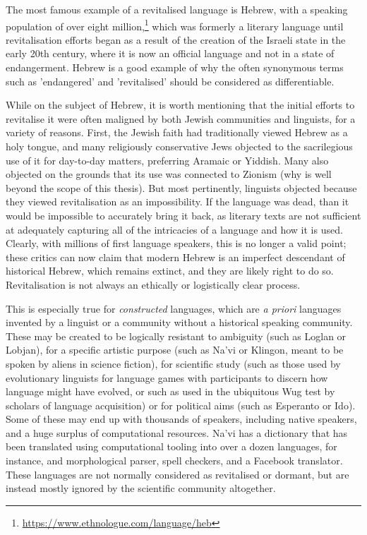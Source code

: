 The most famous example of a revitalised language is Hebrew, with a speaking population of over eight million,\footnote{\href{https://www.ethnologue.com/language/heb}{https://www.ethnologue.com/language/heb}} which was formerly a literary language until revitalisation efforts began as a result of the creation of the Israeli state in the early 20th century, where it is now an official language and not in a state of endangerment. Hebrew is a good example of why the often synonymous terms such as 'endangered' and 'revitalised' should be considered as differentiable.

While on the subject of Hebrew, it is worth mentioning that the initial efforts to revitalise it were often maligned by both Jewish communities and linguists, for a variety of reasons. First, the Jewish faith had traditionally viewed Hebrew as a holy tongue, and many religiously conservative Jews objected to the sacrilegious use of it for day-to-day matters, preferring Aramaic or Yiddish. Many also objected on the grounds that its use was connected to Zionism (why is well beyond the scope of this thesis). But most pertinently, linguists objected because they viewed revitalisation as an impossibility. If the language was dead, than it would be impossible to accurately bring it back, as literary texts are not sufficient at adequately capturing all of the intricacies of a language and how it is used. Clearly, with millions of first language speakers, this is no longer a valid point; these critics can now claim that modern Hebrew is an imperfect descendant of historical Hebrew, which remains extinct, and they are likely right to do so. Revitalisation is not always an ethically or logistically clear process.

This is especially true for {\it constructed} languages, which are {\it a priori} languages invented by a linguist or a community without a historical speaking community. These may be created to be logically resistant to ambiguity (such as Loglan or Lobjan), for a specific artistic purpose (such as Na'vi or Klingon, meant to be spoken by aliens in science fiction), for scientific study (such as those used by evolutionary linguists for language games with participants to discern how language might have evolved, or such as used in the ubiquitous Wug test by scholars of language acquisition) or for political aims (such as Esperanto or Ido). Some of these may end up with thousands of speakers, including native speakers, and a huge surplus of computational resources. Na'vi has a dictionary that has been translated using computational tooling into over a dozen languages, for instance, and morphological parser, spell checkers, and a Facebook translator. These languages are not normally considered as revitalised or dormant, but are instead mostly ignored by the scientific community altogether.

